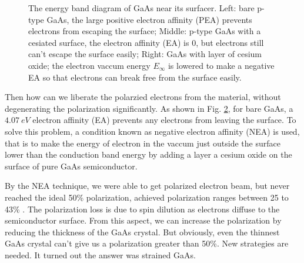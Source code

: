 \begin{figure}[h!]
\begin{subfigure}[b]{0.32\textwidth}
{
	}
	\label{fig:NEA}
    \end{subfigure}
    \caption{The energy band diagram of GaAs near its surfacer. 
    Left: bare p-type GaAs, the large positive electron affinity (PEA) 
    prevents electrons from escaping the surface; 
    Middle: p-type GaAs with a cesiated surface, the electron affinity (EA)
    is 0, but electrons still can't escape the surface easily; 
    Right: GaAs with layer of cesium oxide; the electron vaccum energy $E_\infty$ is
    lowered to make a negative EA so that electrons can break free from the surface
    easily. \cite{CARDMAN1992317}}
    \label{fig:electron_affinity}
\end{figure}
Then how can we liberate the polarzied electrons from the material, without 
degenerating the polarization significantly. As shown in Fig. \ref{fig:electron_affinity},
for bare GaAs, a $4.07 \ eV$ electron affinity (EA) prevents any electrons from
leaving the surface. To solve this problem, a condition known as negative
electron affinity (NEA) is used, that is to make the energy of electron in 
the vaccum just outside the surface lower than the conduction band energy by
adding a layer a cesium oxide on the surface of pure GaAs semiconductor.

By the NEA technique, we were able to get polarized electron beam, but never
reached the ideal 50\% polarization, achieved polarization ranges between 25 to 43\%
. The polarization loss is due to spin dilution as electrons diffuse to the 
semiconductor surface. From this aspect, we can increase the polarization by 
reducing the thickness of the GaAs crystal. But obviously, even the thinnest
GaAs crystal can't give us a polarization greater than 50\%. New strategies 
are needed. It turned out the answer was strained GaAs. \cite{CARDMAN1992317}

